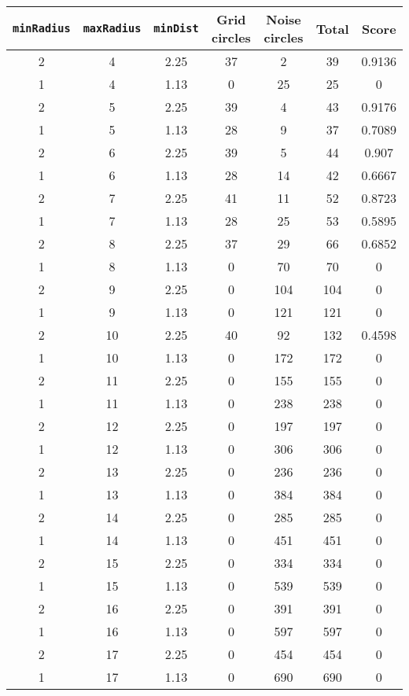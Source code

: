 \documentclass[letterpaper, 12pt]{article}
\begin{document}
\begin{longtable}{|c|c|c|c|c|c|c|}
\hline
\textbf{\texttt{minRadius}} & \textbf{\texttt{maxRadius}} & \textbf{\texttt{minDist}} & \textbf{Grid circles} & \textbf{Noise circles} & \textbf{Total} & \textbf{Score} \\
\hline
2 & 4 & 2.25 & 37 & 2 & 39 & 0.9136 \\
\hline
1 & 4 & 1.13 & 0 & 25 & 25 & 0 \\
\hline
2 & 5 & 2.25 & 39 & 4 & 43 & 0.9176 \\
\hline
1 & 5 & 1.13 & 28 & 9 & 37 & 0.7089 \\
\hline
2 & 6 & 2.25 & 39 & 5 & 44 & 0.907 \\
\hline
1 & 6 & 1.13 & 28 & 14 & 42 & 0.6667 \\
\hline
2 & 7 & 2.25 & 41 & 11 & 52 & 0.8723 \\
\hline
1 & 7 & 1.13 & 28 & 25 & 53 & 0.5895 \\
\hline
2 & 8 & 2.25 & 37 & 29 & 66 & 0.6852 \\
\hline
1 & 8 & 1.13 & 0 & 70 & 70 & 0 \\
\hline
2 & 9 & 2.25 & 0 & 104 & 104 & 0 \\
\hline
1 & 9 & 1.13 & 0 & 121 & 121 & 0 \\
\hline
2 & 10 & 2.25 & 40 & 92 & 132 & 0.4598 \\
\hline
1 & 10 & 1.13 & 0 & 172 & 172 & 0 \\
\hline
2 & 11 & 2.25 & 0 & 155 & 155 & 0 \\
\hline
1 & 11 & 1.13 & 0 & 238 & 238 & 0 \\
\hline
2 & 12 & 2.25 & 0 & 197 & 197 & 0 \\
\hline
1 & 12 & 1.13 & 0 & 306 & 306 & 0 \\
\hline
2 & 13 & 2.25 & 0 & 236 & 236 & 0 \\
\hline
1 & 13 & 1.13 & 0 & 384 & 384 & 0 \\
\hline
2 & 14 & 2.25 & 0 & 285 & 285 & 0 \\
\hline
1 & 14 & 1.13 & 0 & 451 & 451 & 0 \\
\hline
2 & 15 & 2.25 & 0 & 334 & 334 & 0 \\
\hline
1 & 15 & 1.13 & 0 & 539 & 539 & 0 \\
\hline
2 & 16 & 2.25 & 0 & 391 & 391 & 0 \\
\hline
1 & 16 & 1.13 & 0 & 597 & 597 & 0 \\
\hline
2 & 17 & 2.25 & 0 & 454 & 454 & 0 \\
\hline
1 & 17 & 1.13 & 0 & 690 & 690 & 0 \\

\end{longtable}
\end{document}
